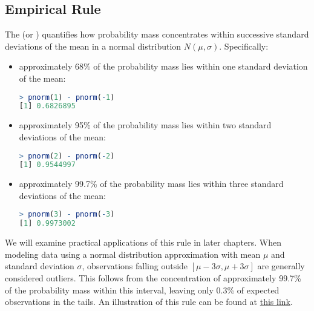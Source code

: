\subsection{Empirical Rule}

The  (or ) quantifies how probability mass concentrates within successive standard deviations of the mean in a normal distribution \( N(\mu, \sigma) \).
Specifically:
\begin{itemize}
    \item approximately 68\% of the probability mass lies within one standard deviation of the mean:
    \begin{lstlisting}[language=R]
> pnorm(1) - pnorm(-1)
[1] 0.6826895      
    \end{lstlisting}
    \item approximately 95\% of the probability mass lies within two standard deviations of the mean:
    \begin{lstlisting}[language=R]
> pnorm(2) - pnorm(-2)
[1] 0.9544997
    \end{lstlisting}
    \item approximately 99.7\% of the probability mass lies within three standard deviations of the mean:
    \begin{lstlisting}[language=R]
> pnorm(3) - pnorm(-3)
[1] 0.9973002
    \end{lstlisting}
\end{itemize}
We will examine practical applications of this rule in later chapters.
When modeling data using a normal distribution approximation with mean \( \mu \) and standard deviation \( \sigma \),
observations falling outside \( [\mu - 3\sigma, \mu + 3\sigma] \) are generally considered outliers.
This follows from the concentration of approximately 99.7\% of the probability mass within this interval,
leaving only 0.3\% of expected observations in the tails.
An illustration of this rule can be found at \href{https://andymath.com/normal-distribution-empirical-rule/}{this link}.

